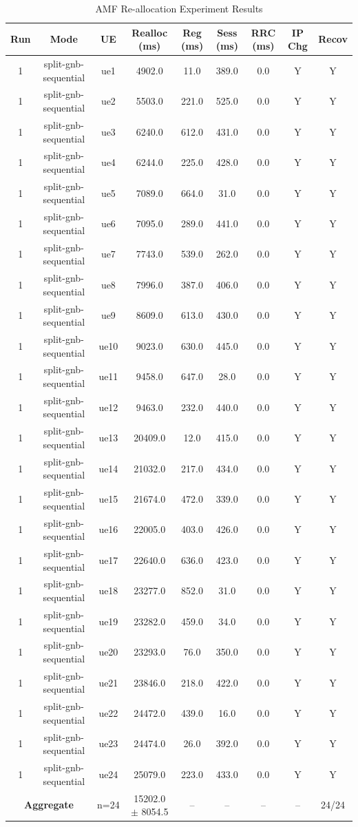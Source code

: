 \begin{table}[ht]
\centering
\begin{tabular}{|c|c|c|c|c|c|c|c|c|}
\hline
Run & Mode & UE & Realloc (ms) & Reg (ms) & Sess (ms) & RRC (ms) & IP Chg & Recov \\
\hline
1 & split-gnb-sequential & ue1 & 4902.0 & 11.0 & 389.0 & 0.0 & Y & Y \\
1 & split-gnb-sequential & ue2 & 5503.0 & 221.0 & 525.0 & 0.0 & Y & Y \\
1 & split-gnb-sequential & ue3 & 6240.0 & 612.0 & 431.0 & 0.0 & Y & Y \\
1 & split-gnb-sequential & ue4 & 6244.0 & 225.0 & 428.0 & 0.0 & Y & Y \\
1 & split-gnb-sequential & ue5 & 7089.0 & 664.0 & 31.0 & 0.0 & Y & Y \\
1 & split-gnb-sequential & ue6 & 7095.0 & 289.0 & 441.0 & 0.0 & Y & Y \\
1 & split-gnb-sequential & ue7 & 7743.0 & 539.0 & 262.0 & 0.0 & Y & Y \\
1 & split-gnb-sequential & ue8 & 7996.0 & 387.0 & 406.0 & 0.0 & Y & Y \\
1 & split-gnb-sequential & ue9 & 8609.0 & 613.0 & 430.0 & 0.0 & Y & Y \\
1 & split-gnb-sequential & ue10 & 9023.0 & 630.0 & 445.0 & 0.0 & Y & Y \\
1 & split-gnb-sequential & ue11 & 9458.0 & 647.0 & 28.0 & 0.0 & Y & Y \\
1 & split-gnb-sequential & ue12 & 9463.0 & 232.0 & 440.0 & 0.0 & Y & Y \\
1 & split-gnb-sequential & ue13 & 20409.0 & 12.0 & 415.0 & 0.0 & Y & Y \\
1 & split-gnb-sequential & ue14 & 21032.0 & 217.0 & 434.0 & 0.0 & Y & Y \\
1 & split-gnb-sequential & ue15 & 21674.0 & 472.0 & 339.0 & 0.0 & Y & Y \\
1 & split-gnb-sequential & ue16 & 22005.0 & 403.0 & 426.0 & 0.0 & Y & Y \\
1 & split-gnb-sequential & ue17 & 22640.0 & 636.0 & 423.0 & 0.0 & Y & Y \\
1 & split-gnb-sequential & ue18 & 23277.0 & 852.0 & 31.0 & 0.0 & Y & Y \\
1 & split-gnb-sequential & ue19 & 23282.0 & 459.0 & 34.0 & 0.0 & Y & Y \\
1 & split-gnb-sequential & ue20 & 23293.0 & 76.0 & 350.0 & 0.0 & Y & Y \\
1 & split-gnb-sequential & ue21 & 23846.0 & 218.0 & 422.0 & 0.0 & Y & Y \\
1 & split-gnb-sequential & ue22 & 24472.0 & 439.0 & 16.0 & 0.0 & Y & Y \\
1 & split-gnb-sequential & ue23 & 24474.0 & 26.0 & 392.0 & 0.0 & Y & Y \\
1 & split-gnb-sequential & ue24 & 25079.0 & 223.0 & 433.0 & 0.0 & Y & Y \\
\multicolumn{2}{|c|}{\textbf{Aggregate}} & n=24 & 15202.0 $\pm$ 8054.5 & -- & -- & -- & -- & 24/24 \\
\hline
\end{tabular}
\caption{AMF Re-allocation Experiment Results}
\label{tab:amf_realloc}
\end{table}
